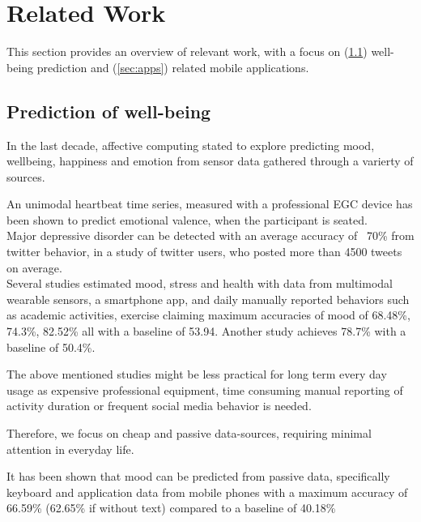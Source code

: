 \documentclass[conference]{IEEEtran}
\begin{document}

\section{Related Work}
This section provides an overview of relevant work, with a focus on (\ref{sec:wellbeing}) well-being prediction and (\ref{sec:apps}) related mobile applications.

\subsection{Prediction of well-being}
\label{sec:wellbeing}

In the last decade, affective computing stated to explore predicting mood, wellbeing, happiness and emotion from sensor data gathered through a varierty of sources.

An unimodal heartbeat time series, measured with a professional EGC device has been shown to predict emotional valence, when the participant is seated. \cite{harper_bayesian_2020}\\


Major depressive disorder can be detected with an average accuracy of ~70\% from twitter behavior, in a study of twitter users, who posted more than 4500 tweets on average\cite{choudhury_predicting_2013}.\\ 

Several studies estimated mood, stress and health with data from multimodal wearable sensors, a smartphone app, and daily manually reported behaviors such as academic activities, exercise claiming maximum accuracies of mood of
 68.48\%\cite{jaques_predicting_2015},
 74.3\%\cite{jaques_multi-task_2015},
 82.52\%\cite{jaques_multi-task_2016} all with a baseline of  53.94. Another study achieves 78.7\% with a baseline of 50.4\%\cite{taylor_personalized_2020}. 
 

The above mentioned studies might be less practical for long term every day usage as expensive professional equipment, time consuming manual reporting of activity duration or frequent social media behavior is needed.

Therefore, we focus on cheap and passive data-sources, requiring minimal attention in everyday life.

It has been shown that mood can be predicted from passive data, specifically keyboard and application data from mobile phones with a maximum accuracy of 66.59\% (62.65\% if without text) compared to a baseline of 40.18\% \cite{liu_multimodal_2020}\\
\end{document}
